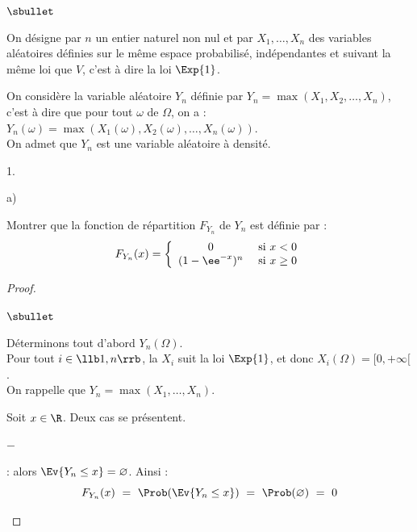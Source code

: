 \begin{noliste}{$\sbullet$}
\item On désigne par $n$ un entier naturel non nul et par $X_{1},
  \ldots, X_{n}$ des variables aléatoires définies sur le même espace
  probabilisé, indépendantes et suivant la même loi que $V$, c'est à
  dire la loi $\Exp{1}$.

\item On considère la variable aléatoire $Y_{n}$ définie par $Y_{n} =
  \max(X_{1},X_{2}, \ldots,X_{n})$, c'est à dire que pour tout
  $\omega$ de $\Omega$, on a : $Y_{n}(\omega) =
  \max(X_{1}(\omega),X_{2}(\omega), \ldots, X_n(\omega))$.\\
  On admet que $Y_{n}$ est une variable aléatoire à densité.
\end{noliste}

\begin{noliste}{1.}
  \setlength{\itemsep}{4mm} %
  \setcounter{enumi}{1}
\item
  \begin{noliste}{a)}
    \setlength{\itemsep}{2mm}
  \item Montrer que la fonction de répartition $F_{Y_{n}}$ de $Y_{n}$
    est définie par :
    \[
    F_{Y_{n}}(x) = \left\{
      \begin{array}{cl}
        0 & \hbox{ si } x<0\\
        (1-\ee^{-x})^{n} & \hbox{ si } x \geq 0
      \end{array}
    \right.
    \]
    
    \begin{proof}~
      \begin{noliste}{$\sbullet$}
      \item Déterminons tout d'abord $Y_n(\Omega)$.\\
	Pour tout $i\in\llb 1,n\rrb$, la \var $X_i$ suit la loi
        $\Exp{1}$, et donc $X_i(\Omega)=[0,+\infty[$.\\
        On rappelle que $Y_n= \max(X_1,\hdots, X_n)$. 
        \conc{Ainsi, $Y_n(\Omega) \ \subset \ [0,+\infty[$.}
	
      \item Soit $x \in \R$. Deux cas se présentent.
	\begin{noliste}{$-$}
        \item {} : alors $\Ev{Y_n\leq x} =
          \varnothing$.
          Ainsi :
	  \[
          F_{Y_n}(x) \ = \ \Prob(\Ev{Y_n\leq x}) \ = \
          \Prob(\varnothing) \ = \ 0
	  \]


\end{noliste}
\end{noliste}
\end{proof}
\end{noliste}
\end{noliste}
